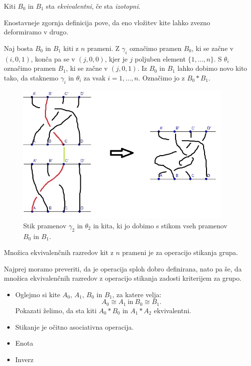 \documentclass[mat1]{fmfdelo}
\begin{document}
\begin{definicija}
Kiti $B_0$ in $B_1$ sta \emph{ekvivalentni}, če sta \emph{izotopni}.
\end{definicija}

\begin{opomba}
Enostavneje zgornja definicija pove, da eno vložitev kite lahko zvezno deformiramo v drugo.
\end{opomba}


Naj bosta $B_0$ in $B_1$ kiti z $n$ prameni. Z $\gamma_i$ označimo pramen $B_0$, ki se začne v $(i, 0, 1)$, konča pa se v $(j, 0, 0)$, kjer je $j$ poljuben element $\{1, \ldots, n\}$. S $\theta_i$ označimo pramen $B_1$, ki se začne v $(j, 0, 1)$. Iz $B_0$ in $B_1$ lahko dobimo novo kito tako, da staknemo $\gamma_i$ in $\theta_i$ za vsak $i=1, \ldots, n$.  Označimo jo z $B_0*B_1$.

\begin{figure}[ht!]
\includegraphics[height = 7cm]{Stikanje_2}
\caption{Stik pramenov $\gamma_2$ in $\theta_2$ in kita, ki jo dobimo s stikom vseh pramenov $B_0$ in $B_1$.}
\end{figure}


\begin{trditev}
Množica ekvivalenčnih razredov kit z $n$ prameni je za operacijo stikanja grupa.
\end{trditev}

\begin{dokaz}
Najprej moramo preveriti, da je operacija sploh dobro definirana, nato pa še, da množica ekvivalenčnih razredov z operacijo stikanja zadosti kriterijem za grupo.
\begin{itemize}
\item{Oglejmo si kite $A_0$, $A_1$, $B_0$ in $B_1$, za katere velja: $$A_0 \cong A_1 \ \text{in} \ B_0 \cong B_1.$$ Pokazati želimo, da sta kiti $A_0*B_0$ in $A_1*A_2$ ekvivalentni. }
\item{Stikanje je očitno asociativna operacija.}
\item{Enota}
\item{Inverz}
\end{itemize}
\end{dokaz}
\end{document}
